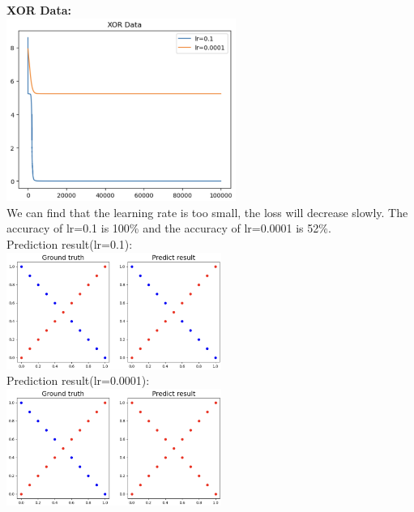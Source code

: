 \documentclass{article} %
\begin{document}
    \textbf{XOR Data:} \\
    \includegraphics[width=7.5cm]{./imgs/xor_loss_cmp.png} \\
    We can find that the learning rate is too small, the loss will decrease slowly. The accuracy of lr=0.1 is 100\% and the accuracy
    of lr=0.0001 is 52\%. \\
    Prediction result(lr=0.1): \\
    \includegraphics[width=7cm]{./imgs/xor_lr0.1.png} \\
    Prediction result(lr=0.0001): \\
    \includegraphics[width=7cm]{./imgs/xor_lr0.0001.png} \\
    
\end{document}
